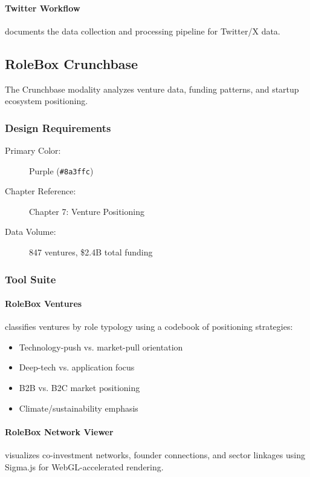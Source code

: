 \paragraph{Twitter Workflow} documents the data collection and processing pipeline for Twitter/X data.

\subsection{RoleBox Crunchbase}

The Crunchbase modality analyzes venture data, funding patterns, and startup ecosystem positioning.

\subsubsection{Design Requirements}

\begin{description}
    \item[Primary Color:] Purple (\texttt{\#8a3ffc})
    \item[Chapter Reference:] Chapter 7: Venture Positioning
    \item[Data Volume:] 847 ventures, \$2.4B total funding
\end{description}

\subsubsection{Tool Suite}

\paragraph{RoleBox Ventures} classifies ventures by role typology using a codebook of positioning strategies:
\begin{itemize}
    \item Technology-push vs. market-pull orientation
    \item Deep-tech vs. application focus
    \item B2B vs. B2C market positioning
    \item Climate/sustainability emphasis
\end{itemize}

\paragraph{RoleBox Network Viewer} visualizes co-investment networks, founder connections, and sector linkages using Sigma.js for WebGL-accelerated rendering.

